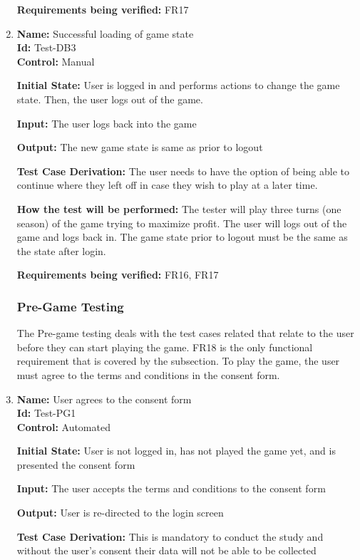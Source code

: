 \documentclass[12pt, titlepage]{article}
\begin{document}
\begin{enumerate}
\textbf{Requirements being verified:} FR17

\item{\textbf{Name:} Successful loading of game state\\} %
\textbf{Id:} Test-DB3    \label{Test-DB3}\\
\textbf{Control:} Manual

\textbf{Initial State:} User is logged in and performs actions to change the game state. Then, the user logs out of the game.

\textbf{Input:} The user logs back into the game

\textbf{Output:} The new game state is same as prior to logout

\textbf{Test Case Derivation:} The user needs to have the option of being able to continue where they left off in case they wish to play at a later time.

\textbf{How the test will be performed:} The tester will play three turns (one season) of the game trying to maximize profit. The user will logs out of the game and logs back in. The game state prior to logout must be the same as the state after login.

\textbf{Requirements being verified:} FR16, FR17

\subsubsection{Pre-Game Testing}
The Pre-game testing deals with the test cases related that relate to the user before they can start playing the game. FR18 is the only functional requirement that is covered by the subsection. To play the game, the user must agree to the terms and conditions in the consent form. 

\item{\textbf{Name:} User agrees to the consent form\\} %
\textbf{Id:} Test-PG1 \label{Test-PG1}\\

\textbf{Control:} Automated

\textbf{Initial State:} User is not logged in, has not played the game yet, and is presented the consent form

\textbf{Input:} The user accepts the terms and conditions to the consent form

\textbf{Output:} User is re-directed to the login screen

\textbf{Test Case Derivation:} This is mandatory to conduct the study and without the user's consent their data will not be able to be collected


\end{enumerate}
\end{document}
